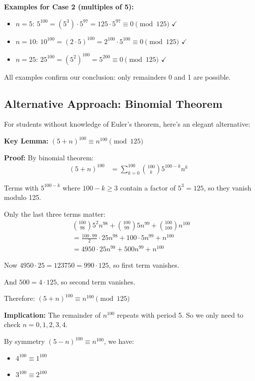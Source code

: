 \documentclass[12pt]{article}
\begin{document}
\begin{solutionbox}
\textbf{Examples for Case 2 (multiples of 5):}

\begin{itemize}
    \item $n = 5$: $5^{100} = (5^3) \cdot 5^{97} = 125 \cdot 5^{97} \equiv 0 \pmod{125}$ $\checkmark$
    \item $n = 10$: $10^{100} = (2 \cdot 5)^{100} = 2^{100} \cdot 5^{100} \equiv 0 \pmod{125}$ $\checkmark$
    \item $n = 25$: $25^{100} = (5^2)^{100} = 5^{200} \equiv 0 \pmod{125}$ $\checkmark$
\end{itemize}

All examples confirm our conclusion: only remainders 0 and 1 are possible.

\subsection*{Alternative Approach: Binomial Theorem}

For students without knowledge of Euler's theorem, here's an elegant alternative:

\textbf{Key Lemma:} $(5 + n)^{100} \equiv n^{100} \pmod{125}$

\textbf{Proof:} By binomial theorem:
\begin{align*}
(5 + n)^{100} &= \sum_{k=0}^{100} \binom{100}{k} 5^{100-k} n^k
\end{align*}

Terms with $5^{100-k}$ where $100 - k \geq 3$ contain a factor of $5^3 = 125$, so they vanish modulo 125.

Only the last three terms matter:
\begin{align*}
&\binom{100}{98} 5^2 n^{98} + \binom{100}{99} 5 n^{99} + \binom{100}{100} n^{100} \\
&= \frac{100 \cdot 99}{2} \cdot 25 n^{98} + 100 \cdot 5 n^{99} + n^{100} \\
&= 4950 \cdot 25 n^{98} + 500 n^{99} + n^{100}
\end{align*}

Now $4950 \cdot 25 = 123750 = 990 \cdot 125$, so first term vanishes.

And $500 = 4 \cdot 125$, so second term vanishes.

Therefore: $(5 + n)^{100} \equiv n^{100} \pmod{125}$

\textbf{Implication:} The remainder of $n^{100}$ repeats with period 5. So we only need to check $n = 0, 1, 2, 3, 4$.

By symmetry $(5-n)^{100} \equiv n^{100}$, we have:
\begin{itemize}
    \item $4^{100} \equiv 1^{100}$
    \item $3^{100} \equiv 2^{100}$
\end{itemize}


\end{solutionbox}
\end{document}
